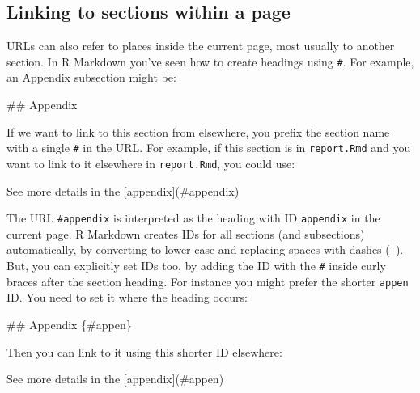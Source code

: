 \documentclass[]{Nemilov}
\newenvironment{Shaded}{\begin{snugshade}}{\end{snugshade}}
\newcommand{\FunctionTok}[1]{\textcolor[rgb]{0.00,0.00,0.00}{#1}}
\newcommand{\NormalTok}[1]{#1}
\newcommand{\OtherTok}[1]{\textcolor[rgb]{0.56,0.35,0.01}{#1}}
\begin{document}
\hypertarget{linking-to-sections-within-a-page}{%
\subsection{Linking to sections within a page}\label{linking-to-sections-within-a-page}}

URLs can also refer to places inside the current page, most usually to another section. In R Markdown you've seen how to create headings using \texttt{\#}. For example, an Appendix subsection might be:

\begin{Shaded}
\begin{Highlighting}[]
\FunctionTok{## Appendix}
\end{Highlighting}
\end{Shaded}

If we want to link to this section from elsewhere, you prefix the section name with a single \texttt{\#} in the URL. For example, if this section is in \texttt{report.Rmd} and you want to link to it elsewhere in \texttt{report.Rmd}, you could use:

\begin{Shaded}
\begin{Highlighting}[]
\NormalTok{See more details in the }\OtherTok{[appendix](#appendix)}
\end{Highlighting}
\end{Shaded}

The URL \texttt{\#appendix} is interpreted as the heading with ID \texttt{appendix} in the current page. R Markdown creates IDs for all sections (and subsections) automatically, by converting to lower case and replacing spaces with dashes (\texttt{-}). But, you can explicitly set IDs too, by adding the ID with the \texttt{\#} inside curly braces after the section heading. For instance you might prefer the shorter \texttt{appen} ID. You need to set it where the heading occurs:

\begin{Shaded}
\begin{Highlighting}[]
\FunctionTok{## Appendix \{#appen\}}
\end{Highlighting}
\end{Shaded}

Then you can link to it using this shorter ID elsewhere:

\begin{Shaded}
\begin{Highlighting}[]
\NormalTok{See more details in the }\OtherTok{[appendix](#appen)}
\end{Highlighting}
\end{Shaded}
\end{document}
